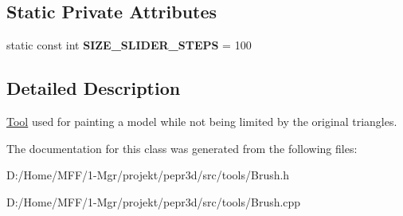 \subsection*{Static Private Attributes}
\begin{DoxyCompactItemize}
\item 
\mbox{\label{classpepr3d_1_1_brush_a5972a5bd5dfabb665294af0a1e3fc2e3}} 
static const int {\bfseries S\+I\+Z\+E\+\_\+\+S\+L\+I\+D\+E\+R\+\_\+\+S\+T\+E\+PS} = 100
\end{DoxyCompactItemize}


\subsection{Detailed Description}
\mbox{\hyperlink{classpepr3d_1_1_tool}{Tool}} used for painting a model while not being limited by the original triangles. 

The documentation for this class was generated from the following files\+:\begin{DoxyCompactItemize}
\item 
D\+:/\+Home/\+M\+F\+F/1-\/\+Mgr/projekt/pepr3d/src/tools/Brush.\+h\item 
D\+:/\+Home/\+M\+F\+F/1-\/\+Mgr/projekt/pepr3d/src/tools/Brush.\+cpp\end{DoxyCompactItemize}
